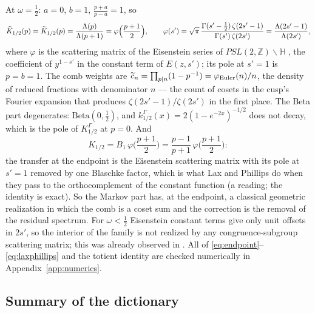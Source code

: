 At $\omega=\frac12$: $a=0$, $b=1$, $\frac{p+a}{p-a}=1$, so
\begin{equation}\label{eq:endpoint}
 \widehat K_{1/2}(p)=\widetilde K_{1/2}(p)=\frac{\Lambda(p)}{\Lambda(p+1)}=\varphi\Big(\frac{p+1}2\Big),
 \qquad
 \varphi(s')=\sqrt\pi\,\frac{\Gamma(s'-\frac12)\,\zeta(2s'-1)}{\Gamma(s')\,\zeta(2s')}
 =\frac{\Lambda(2s'-1)}{\Lambda(2s')},
\end{equation}
where $\varphi$ is the scattering matrix of the Eisenstein series of
$PSL(2,\mathbb Z)\backslash\mathbb H$ \cite{Iwaniec}, the coefficient of
$y^{1-s'}$ in the constant term of $E(z,s')$; its pole at $s'=1$ is $p=b=1$.
The comb weights are $\widetilde c_n=\prod_{p\mid n}(1-p^{-1})=\varphi_{\mathrm{Euler}}(n)/n$,
the density of reduced fractions with denominator $n$ --- the count of cosets
in the cusp's Fourier expansion that produces $\zeta(2s'-1)/\zeta(2s')$ in the
first place. The Beta part degenerates: $\mathrm{Beta}(0,\frac12)$, and
$k^\Gamma_{1/2}(x)=2(1-e^{-2x})^{-1/2}$ does not decay, which is the pole of
$K^\Gamma_{1/2}$ at $p=0$. And
\begin{equation}\label{eq:laxphillips}
 K_{1/2}=B_1\,\varphi\Big(\frac{p+1}2\Big)=\frac{p-1}{p+1}\,\varphi\Big(\frac{p+1}2\Big):
\end{equation}
the transfer at the endpoint is the Eisenstein scattering matrix with its pole
at $s'=1$ removed by one Blaschke factor, which is what Lax and Phillips do
when they pass to the orthocomplement of the constant function
\cite{LaxPhillips} (a reading; the identity is exact). So the Markov part has,
at the endpoint, a classical geometric realization in which the comb is a
coset sum and the correction is the removal of the residual spectrum. For
$\omega<\frac12$ Eisenstein constant terms give only unit offsets in $2s'$, so
the interior of the family is not realized by any congruence-subgroup
scattering matrix; this was already observed in \cite{WilsonReview}. All of
\eqref{eq:endpoint}--\eqref{eq:laxphillips} and the totient identity are
checked numerically in Appendix~\ref{app:numerics}.

\subsection{Summary of the dictionary}

